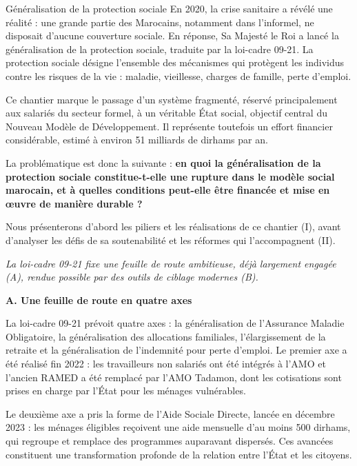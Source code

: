 \begin{copiemodele}{Généralisation de la protection sociale}
En 2020, la crise sanitaire a révélé une réalité : une grande partie des Marocains, notamment dans l'informel, ne disposait d'aucune couverture sociale. En réponse, Sa Majesté le Roi a lancé la généralisation de la protection sociale, traduite par la loi-cadre 09-21. La protection sociale désigne l'ensemble des mécanismes qui protègent les individus contre les risques de la vie : maladie, vieillesse, charges de famille, perte d'emploi.

Ce chantier marque le passage d'un système fragmenté, réservé principalement aux salariés du secteur formel, à un véritable État social, objectif central du Nouveau Modèle de Développement. Il représente toutefois un effort financier considérable, estimé à environ 51 milliards de dirhams par an.

La problématique est donc la suivante : \textbf{en quoi la généralisation de la protection sociale constitue-t-elle une rupture dans le modèle social marocain, et à quelles conditions peut-elle être financée et mise en œuvre de manière durable ?}

Nous présenterons d'abord les piliers et les réalisations de ce chantier (I), avant d'analyser les défis de sa soutenabilité et les réformes qui l'accompagnent (II).

\textit{La loi-cadre 09-21 fixe une feuille de route ambitieuse, déjà largement engagée (A), rendue possible par des outils de ciblage modernes (B).}

\textbf{A. Une feuille de route en quatre axes}

La loi-cadre 09-21 prévoit quatre axes : la généralisation de l'Assurance Maladie Obligatoire, la généralisation des allocations familiales, l'élargissement de la retraite et la généralisation de l'indemnité pour perte d'emploi. Le premier axe a été réalisé fin 2022 : les travailleurs non salariés ont été intégrés à l'AMO et l'ancien RAMED a été remplacé par l'AMO Tadamon, dont les cotisations sont prises en charge par l'État pour les ménages vulnérables.

Le deuxième axe a pris la forme de l'Aide Sociale Directe, lancée en décembre 2023 : les ménages éligibles reçoivent une aide mensuelle d'au moins 500 dirhams, qui regroupe et remplace des programmes auparavant dispersés. Ces avancées constituent une transformation profonde de la relation entre l'État et les citoyens.


\end{copiemodele}
